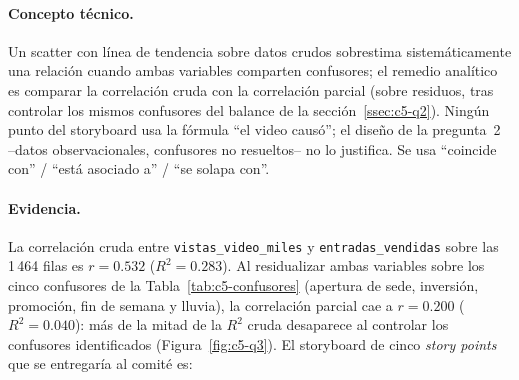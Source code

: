 \paragraph{Concepto técnico.} Un scatter con línea de tendencia sobre datos crudos sobrestima sistemáticamente una relación cuando ambas variables comparten confusores; el remedio analítico es comparar la correlación cruda con la correlación parcial (sobre residuos, tras controlar los mismos confusores del balance de la sección~\ref{ssec:c5-q2}). Ningún punto del storyboard usa la fórmula ``el video causó''; el diseño de la pregunta~2 --datos observacionales, confusores no resueltos-- no lo justifica. Se usa ``coincide con'' / ``está asociado a'' / ``se solapa con''.

\paragraph{Evidencia.} La correlación cruda entre \texttt{vistas\_video\_miles} y \texttt{entradas\_vendidas} sobre las 1\,464 filas es $r=0.532$ ($R^2=0.283$). Al residualizar ambas variables sobre los cinco confusores de la Tabla~\ref{tab:c5-confusores} (apertura de sede, inversión, promoción, fin de semana y lluvia), la correlación parcial cae a $r=0.200$ ($R^2=0.040$): más de la mitad de la $R^2$ cruda desaparece al controlar los confusores identificados (Figura~\ref{fig:c5-q3}). El storyboard de cinco \emph{story points} que se entregaría al comité es:

